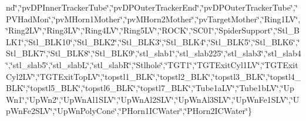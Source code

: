 \begin{DoxyCompactItemize}
nd\char`\"{},\char`\"{}pv\-D\-P\-Inner\-Tracker\-Tube\char`\"{},\char`\"{}pv\-D\-P\-Outer\-Tracker\-End\char`\"{},\char`\"{}pv\-D\-P\-Outer\-Tracker\-Tube\char`\"{},\char`\"{}P\-V\-Had\-Mon\char`\"{},\char`\"{}pv\-M\-Horn1\-Mother\char`\"{},\char`\"{}pv\-M\-Horn2\-Mother\char`\"{},\char`\"{}pv\-Target\-Mother\char`\"{},\char`\"{}Ring1\-L\-V\char`\"{},\char`\"{}Ring2\-L\-V\char`\"{},\char`\"{}Ring3\-L\-V\char`\"{},\char`\"{}Ring4\-L\-V\char`\"{},\char`\"{}Ring5\-L\-V\char`\"{},\char`\"{}R\-O\-C\-K\char`\"{},\char`\"{}S\-C01\char`\"{},\char`\"{}Spider\-Support\char`\"{},\char`\"{}Stl\-\_\-\-B\-L\-K1\char`\"{},\char`\"{}Stl\-\_\-\-B\-L\-K10\char`\"{},\char`\"{}Stl\-\_\-\-B\-L\-K2\char`\"{},\char`\"{}Stl\-\_\-\-B\-L\-K3\char`\"{},\char`\"{}Stl\-\_\-\-B\-L\-K4\char`\"{},\char`\"{}Stl\-\_\-\-B\-L\-K5\char`\"{},\char`\"{}Stl\-\_\-\-B\-L\-K6\char`\"{},\char`\"{}Stl\-\_\-\-B\-L\-K7\char`\"{},\char`\"{}Stl\-\_\-\-B\-L\-K8\char`\"{},\char`\"{}Stl\-\_\-\-B\-L\-K9\char`\"{},\char`\"{}stl\-\_\-slab1\char`\"{},\char`\"{}stl\-\_\-slab225\char`\"{},\char`\"{}stl\-\_\-slab3\char`\"{},\char`\"{}stl\-\_\-slab4\char`\"{},\char`\"{}stl\-\_\-slab5\char`\"{},\char`\"{}stl\-\_\-slab\-L\char`\"{},\char`\"{}stl\-\_\-slab\-R\char`\"{},\char`\"{}Stlhole\char`\"{},\char`\"{}T\-G\-T1\char`\"{},\char`\"{}T\-G\-T\-Exit\-Cyl1\-L\-V\char`\"{},\char`\"{}T\-G\-T\-Exit\-Cyl2\-L\-V\char`\"{},\char`\"{}T\-G\-T\-Exit\-Top\-L\-V\char`\"{},\char`\"{}topstl1\-\_\-\-B\-L\-K\char`\"{},\char`\"{}topstl2\-\_\-\-B\-L\-K\char`\"{},\char`\"{}topstl3\-\_\-\-B\-L\-K\char`\"{},\char`\"{}topstl4\-\_\-\-B\-L\-K\char`\"{},\char`\"{}topstl5\-\_\-\-B\-L\-K\char`\"{},\char`\"{}topstl6\-\_\-\-B\-L\-K\char`\"{},\char`\"{}topstl7\-\_\-\-B\-L\-K\char`\"{},\char`\"{}Tube1a\-L\-V\char`\"{},\char`\"{}Tube1b\-L\-V\char`\"{},\char`\"{}Up\-Wn1\char`\"{},\char`\"{}Up\-Wn2\char`\"{},\char`\"{}Up\-Wn\-Al1\-S\-L\-V\char`\"{},\char`\"{}Up\-Wn\-Al2\-S\-L\-V\char`\"{},\char`\"{}Up\-Wn\-Al3\-S\-L\-V\char`\"{},\char`\"{}Up\-Wn\-Fe1\-S\-L\-V\char`\"{},\char`\"{}Up\-Wn\-Fe2\-S\-L\-V\char`\"{},\char`\"{}Up\-Wn\-Poly\-Cone\char`\"{},\char`\"{}P\-Horn1\-I\-C\-Water\char`\"{},\char`\"{}P\-Horn2\-I\-C\-Water\char`\"{}\}
\item 

\end{DoxyCompactItemize}
